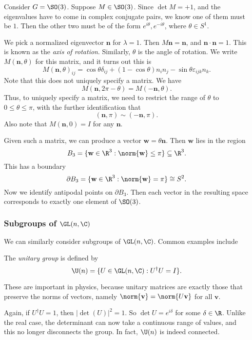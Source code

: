 \documentclass[a4paper]{article}
\begin{document}
\begin{eg}
  Consider $G = \SO(3)$. Suppose $M \in \SO(3)$. Since $\det M = +1$, and the eigenvalues have to come in complex conjugate pairs, we know one of them must be $1$. Then the other two must be of the form $e^{i\theta}, e^{-i\theta}$, where $\theta \in S^1$.

  We pick a normalized eigenvector $\mathbf{n}$ for $\lambda = 1$. Then $M\mathbf{n} = \mathbf{n}$, and $\mathbf{n} \cdot \mathbf{n} = 1$. This is known as the \emph{axis of rotation}. Similarly, $\theta$ is the angle of rotation. We write $M(\mathbf{n}, \theta)$ for this matrix, and it turns out this is
  \[
    M(\mathbf{n}, \theta)_{ij} = \cos \theta \delta_{ij} + (1 - \cos \theta)n_i n_j - \sin \theta \varepsilon_{ijk} n_k.
  \]
  Note that this does not uniquely specify a matrix. We have
  \[
    M(\mathbf{n}, 2\pi - \theta) = M(-\mathbf{n}, \theta).
  \]
  Thus, to uniquely specify a matrix, we need to restrict the range of $\theta$ to $0 \leq \theta \leq \pi$, with the further identification that
  \[
    (\mathbf{n}, \pi) \sim (-\mathbf{n}, \pi).
  \]
  Also note that $M(\mathbf{n}, 0) = I$ for any $\mathbf{n}$.

  Given such a matrix, we can produce a vector $\mathbf{w} = \theta \mathbf{n}$. Then $\mathbf{w}$ lies in the region
  \[
    B_3 = \{\mathbf{w} \in \R^3: \norm{\mathbf{w}} \leq \pi\} \subseteq \R^3.
  \]
  This has a boundary
  \[
    \partial B_3 = \{\mathbf{w} \in \R^3: \norm{\mathbf{w}} = \pi\} \cong S^2.
  \]
  Now we identify antipodal points on $\partial B_3$. Then each vector in the resulting space corresponds to exactly one element of $\SO(3)$.
\end{eg}

\subsubsection*{Subgroups of \texorpdfstring{$\GL(n, \C)$}{GL(n, C)}}
We can similarly consider subgroups of $\GL(n, \C)$. Common examples include
\begin{defi}
  The \emph{unitary group} is defined by
  \[
    \U(n) = \{U \in \GL(n, \C): U^\dagger U = I\}.
  \]
\end{defi}
These are important in physics, because unitary matrices are exactly those that preserve the norms of vectors, namely $\norm{\mathbf{v}} = \norm{U\mathbf{v}}$ for all $\mathbf{v}$.

Again, if $U^\dagger U = 1$, then $|\det(U)|^2 = 1$. So $\det U = e^{i\delta}$ for some $\delta \in \R$. Unlike the real case, the determinant can now take a continuous range of values, and this no longer disconnects the group. In fact, $\U(n)$ is indeed connected.
\end{document}
